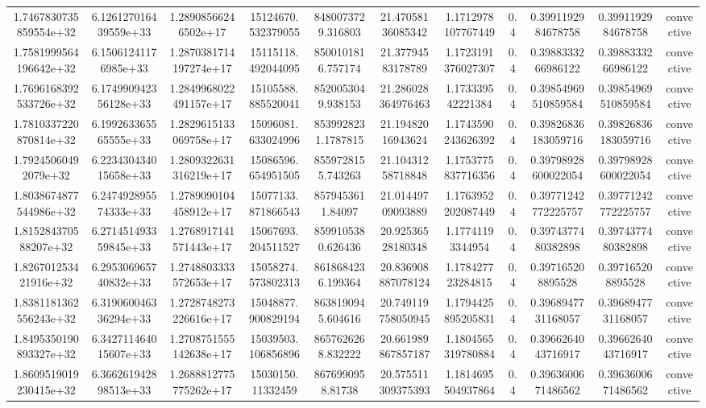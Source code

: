 \begin{table}
\begin{tabular}{ccccccccccc}
1.7467830735859554e+32 & 6.126127016439559e+33 & 1.28908566246502e+17 & 15124670.532379055 & 8480073729.316803 & 21.47058136085342 & 1.1712978107767449 & 0.4 & 0.3991192984678758 & 0.3991192984678758 & convective \\
1.7581999564196642e+32 & 6.15061241176985e+33 & 1.2870381714197274e+17 & 15115118.492044095 & 8500101816.757174 & 21.37794583178789 & 1.1723191376027307 & 0.4 & 0.3988333266986122 & 0.3988333266986122 & convective \\
1.7696168392533726e+32 & 6.174990942356128e+33 & 1.2849968022491157e+17 & 15105588.885520041 & 8520053049.938153 & 21.286028364976463 & 1.173339542221384 & 0.4 & 0.39854969510859584 & 0.39854969510859584 & convective \\
1.7810337220870814e+32 & 6.199263365565555e+33 & 1.2829615133069758e+17 & 15096081.633024996 & 8539928231.1787815 & 21.19482016943624 & 1.1743590243626392 & 0.4 & 0.39826836183059716 & 0.39826836183059716 & convective \\
1.79245060492079e+32 & 6.223430434015658e+33 & 1.2809322631316219e+17 & 15086596.654951505 & 8559728155.743263 & 21.10431258718848 & 1.1753775837716356 & 0.4 & 0.39798928600022054 & 0.39798928600022054 & convective \\
1.8038674877544986e+32 & 6.247492895574333e+33 & 1.2789090104458912e+17 & 15077133.871866543 & 8579453611.84097 & 21.01449709093889 & 1.1763952202087449 & 0.4 & 0.39771242772225757 & 0.39771242772225757 & convective \\
1.815284370588207e+32 & 6.271451493359845e+33 & 1.2768917141571443e+17 & 15067693.204511527 & 8599105380.626436 & 20.92536528180348 & 1.17741193344954 & 0.4 & 0.3974377480382898 & 0.3974377480382898 & convective \\
1.826701253421916e+32 & 6.295306965740832e+33 & 1.2748803333572653e+17 & 15058274.573802313 & 8618684236.199364 & 20.836908887078124 & 1.178427723284815 & 0.4 & 0.397165208895528 & 0.397165208895528 & convective \\
1.8381181362556243e+32 & 6.319060046336294e+33 & 1.2728748273226616e+17 & 15048877.900829194 & 8638190945.604616 & 20.749119758050945 & 1.1794425895205831 & 0.4 & 0.3968947731168057 & 0.3968947731168057 & convective \\
1.8495350190893327e+32 & 6.342711464015607e+33 & 1.2708751555142638e+17 & 15039503.106856896 & 8657626268.832222 & 20.661989867857187 & 1.1804565319780884 & 0.4 & 0.3966264043716917 & 0.3966264043716917 & convective \\
1.8609519019230415e+32 & 6.366261942898513e+33 & 1.2688812775775262e+17 & 15030150.11332459 & 8676990958.81738 & 20.575511309375393 & 1.1814695504937864 & 0.4 & 0.3963600671486562 & 0.3963600671486562 & convective \\

\end{tabular}
\end{table}
